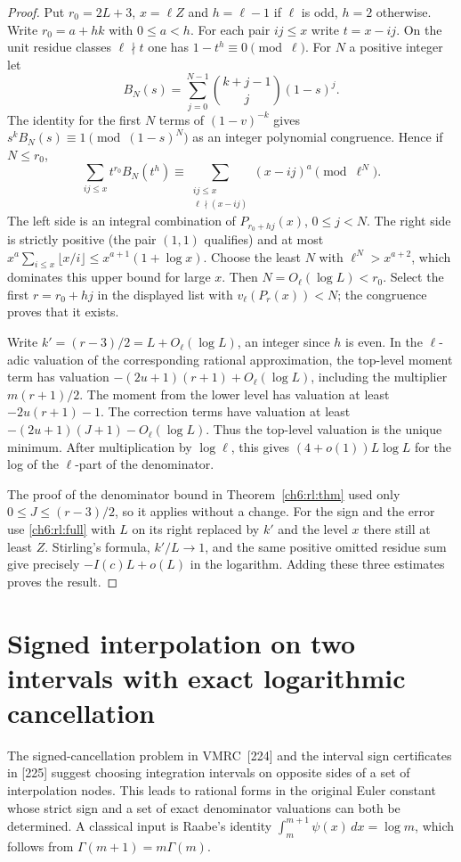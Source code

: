 \documentclass[11pt,a4paper,oneside,openany]{report}
\theoremstyle{remark}\newtheorem{remark}[theorem]{Remark}
\numberwithin{equation}{section}
\begin{document}
\begin{proof}
Put $r_0=2L+3$, $x=\ell Z$ and $h=\ell-1$ if $\ell$ is odd,
$h=2$ otherwise. Write $r_0=a+hk$ with $0\le a<h$.
For each pair $ij\le x$ write $t=x-ij$. On the unit residue classes
$\ell\nmid t$ one has $1-t^h\equiv0\pmod\ell$.
For $N$ a positive integer let
\[
 B_N(s)=\sum_{j=0}^{N-1}\binom{k+j-1}{j}(1-s)^j .
\]
The identity for the first $N$ terms of $(1-v)^{-k}$ gives
$s^k B_N(s)\equiv1\pmod{(1-s)^N}$ as an integer polynomial
congruence. Hence if $N\le r_0$,
\[
 \sum_{ij\le x}t^{r_0}B_N(t^h)
       \equiv\sum_{\substack{ij\le x\\\ell\nmid (x-ij)}}
                    (x-ij)^a\pmod{\ell^N}.
\]
The left side is an integral combination of
$P_{r_0+hj}(x)$, $0\le j<N$. The right side is strictly positive
(the pair $(1,1)$ qualifies) and at most
$x^a\sum_{i\le x}\lfloor x/i\rfloor\le x^{a+1}(1+\log x)$.
Choose the least $N$ with $\ell^N>x^{a+2}$, which dominates this
upper bound for large $x$. Then $N=O_\ell(\log L)<r_0$.
Select the first $r=r_0+hj$ in the displayed list with
$v_\ell(P_r(x))<N$; the congruence proves that it exists.

Write $k'=(r-3)/2=L+O_\ell(\log L)$, an integer since $h$ is even.
In the $\ell$-adic valuation of the corresponding rational
approximation, the top-level moment term has valuation
$-(2u+1)(r+1)+O_\ell(\log L)$, including the multiplier
$m(r+1)/2$. The moment from the lower level has valuation at
least $-2u(r+1)-1$. The correction terms have valuation at least
$-(2u+1)(J+1)-O_\ell(\log L)$. Thus the top-level valuation
is the unique minimum. After multiplication by $\log\ell$, this
gives $(4+o(1))L\log L$ for the log of the $\ell$-part
of the denominator.

The proof of the denominator bound in Theorem~\ref{ch6:rl:thm}
used only $0\le J\le(r-3)/2$, so it applies without a change.
For the sign and the error use \eqref{ch6:rl:full} with $L$ on its
right replaced by $k'$ and the level $x$ there still at least $Z$.
Stirling's formula, $k'/L\to1$, and the same positive omitted
residue sum give precisely $-I(c)L+o(L)$ in the logarithm.
Adding these three estimates proves the result.
\end{proof}

\section{Signed interpolation on two intervals with exact logarithmic cancellation}\label{ch6:sec:interp}
The signed-cancellation problem in VMRC~[224] and the interval sign certificates in [225] suggest choosing integration intervals on opposite sides of a set of interpolation nodes. This leads to rational forms in the original Euler constant whose strict sign and a set of exact denominator valuations can both be determined. A classical input is Raabe's identity $\int_m^{m+1}\psi(x)\,dx=\log m$, which follows from $\Gamma(m+1)=m\Gamma(m)$.
\end{document}
